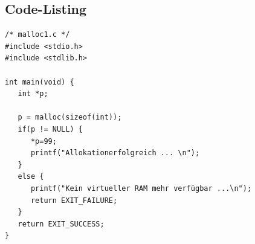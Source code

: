 \subsection{Code-Listing}

\begin{lstlisting}[caption=Beispiel Speicherallozierung,label=list:mal]
 /* malloc1.c */
#include <stdio.h>
#include <stdlib.h>

int main(void) {
   int *p;

   p = malloc(sizeof(int));
   if(p != NULL) {
      *p=99;
      printf("Allokationerfolgreich ... \n");
   }
   else {
      printf("Kein virtueller RAM mehr verfügbar ...\n");
      return EXIT_FAILURE;
   }
   return EXIT_SUCCESS;
}
\end{lstlisting}
